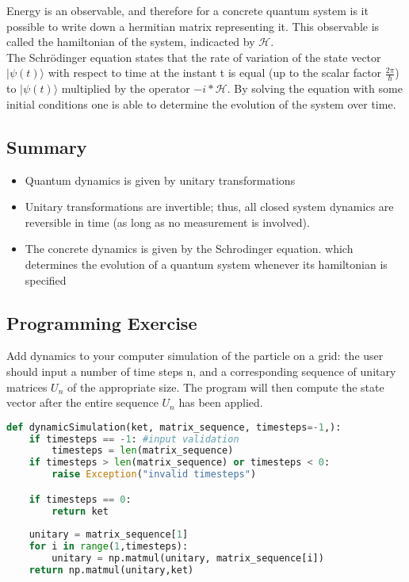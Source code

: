 \documentclass{article}
\begin{document}
Energy is an observable, and therefore for a concrete quantum system is it possible to write down a hermitian matrix representing it. This observable is called the hamiltonian of the system, indicacted by $\mathcal{H}$.\\

The Schr\"{o}dinger equation states that the rate of variation of the state vector $|\psi(t)\rangle$ with respect to time at the instant t is equal (up to the scalar factor $\frac{2\pi}{\hslash}$) to $|\psi(t)\rangle$ multiplied by the operator $-i * \mathcal{H}$. By solving the equation with some initial conditions one is able to determine the evolution of the system over time. 


\subsection{Summary}

\begin{itemize}
    \item Quantum dynamics is given by unitary transformations
    \item Unitary transformations are invertible; thus, all closed system dynamics are reversible in time (as long as no measurement is involved).
    \item The concrete dynamics is given by the Schrodinger equation. which determines the evolution of a quantum system whenever its hamiltonian is specified
\end{itemize}

\subsection{Programming Exercise}
Add dynamics to your computer simulation of the particle on a grid: the user should input a number of time steps n, and a corresponding sequence of unitary matrices $U_n$ of the appropriate size. The program will then compute the state vector after the entire sequence $U_n$ has been applied.\\
\begin{lstlisting}[language=Python]
def dynamicSimulation(ket, matrix_sequence, timesteps=-1,):
    if timesteps == -1: #input validation
        timesteps = len(matrix_sequence)
    if timesteps > len(matrix_sequence) or timesteps < 0:
        raise Exception("invalid timesteps")

    if timesteps == 0:
        return ket
    
    unitary = matrix_sequence[1]
    for i in range(1,timesteps):
        unitary = np.matmul(unitary, matrix_sequence[i])
    return np.matmul(unitary,ket)
\end{lstlisting}
\end{document}
